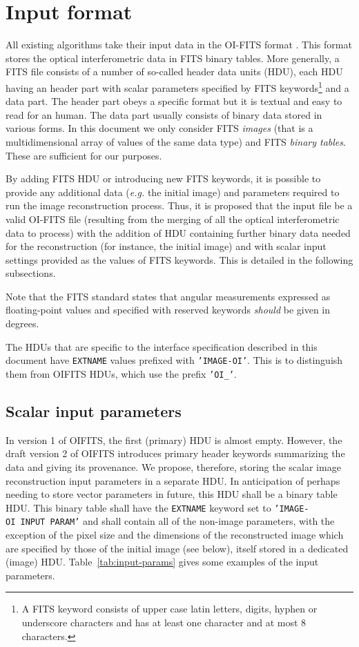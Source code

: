 \documentclass{article}
\newcommand{\KEYWORD}[1]{\texttt{#1}} %
\newcommand{\STRING}[1]{\texttt{'#1'}} %
\begin{document}
\section{Input format}

All existing algorithms take their input data in the OI-FITS format
\citep{Pauls_et_al-2005-oifits}.  This format stores the optical
interferometric data in FITS binary tables.  More generally, a FITS file
\citep{Pence_et_al-2010-FITS} consists of a number of so-called header data
units (HDU), each HDU having an header part with scalar parameters
specified by FITS keywords\footnote{A FITS keyword consists of upper case
  latin letters, digits, hyphen or underscore characters and has at least
  one character and at most 8 characters.} and a data part.  The
header part obeys a specific format but it is textual and easy to read for
an human.  The data part usually consists of binary data stored in various
forms.  In this document we only consider FITS \emph{images} (that is a
multidimensional array of values of the same data type) and FITS
\emph{binary tables}.  These are sufficient for our purposes.

By adding FITS HDU or introducing new FITS keywords, it is possible to
provide any additional data (\emph{e.g.} the initial image) and
parameters required to run the image reconstruction process.  Thus, it
is proposed that the input file be a valid OI-FITS file (resulting
from the merging of all the optical interferometric data to process)
with the addition of HDU containing further binary data needed for the
reconstruction (for instance, the initial image) and with scalar input
settings provided as the values of FITS keywords.  This is detailed in
the following subsections.

Note that the FITS standard states that angular measurements expressed
as floating-point values and specified with reserved keywords
\emph{should} be given in degrees.

The HDUs that are specific to the interface specification described in this
document have \KEYWORD{EXTNAME} values prefixed with \STRING{IMAGE-OI}.
This is to distinguish them from OIFITS HDUs, which use the prefix
\STRING{OI\_}.


\subsection{Scalar input parameters}

In version 1 of OIFITS, the first (primary) HDU is almost empty.  However,
the draft version 2 of OIFITS introduces primary header keywords
summarizing the data and giving its provenance.  We propose, therefore,
storing the scalar image reconstruction input parameters in a separate HDU.
In anticipation of perhaps needing to store vector parameters in future,
this HDU shall be a binary table HDU.  This binary table shall have the
\KEYWORD{EXTNAME} keyword set to \STRING{IMAGE-OI~INPUT~PARAM} and shall
contain all of the non-image parameters, with the exception of the pixel
size and the dimensions of the reconstructed image which are specified by
those of the initial image (see below), itself stored in a dedicated
(image) HDU. Table~\ref{tab:input-params} gives some examples of the input
parameters.
\end{document}
